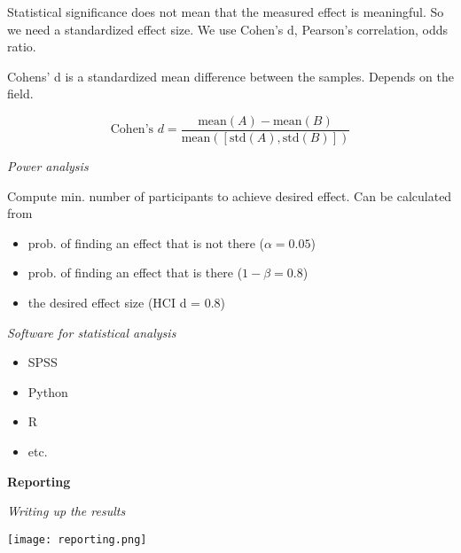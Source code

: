 Statistical significance does not mean that the measured effect is meaningful. So we need a standardized effect size. We use Cohen's d, Pearson's correlation, odds ratio. 

Cohens' d is a standardized mean difference between the samples. Depends on the field. 

$$\text{Cohen's } d = \frac{\text{mean}(A) - \text{mean}(B)}{\text{mean}([\text{std}(A), \text{std}(B)])}$$

\textit{Power analysis} \smallskip

Compute min. number of participants to achieve desired effect. Can be calculated from 

\begin{itemize}
    \item prob. of finding an effect that is not there ($\alpha = 0.05$)
    \item prob. of finding an effect that is there ($1-\beta = 0.8$)
    \item the desired effect size (HCI d = 0.8)
  
\end{itemize}

\textit{Software for statistical analysis} \smallskip

\begin{multicols}{4}
    \begin{itemize}
        \item SPSS
        \item Python
        \item R
        \item etc. 
    \end{itemize}
\end{multicols}


\textbf{Reporting} \smallskip


\textit{Writing up the results} \smallskip

\begin{center}
	\texttt{[image: reporting.png]}
\end{center}













